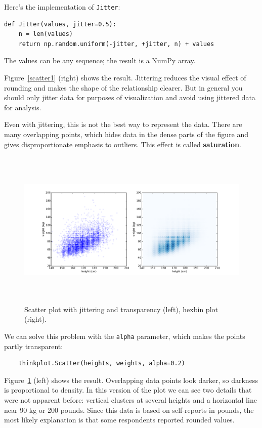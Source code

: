 \documentclass[12pt]{book}
\begin{document}
Here's the implementation of {\tt Jitter}:

\begin{verbatim}
def Jitter(values, jitter=0.5):
    n = len(values)
    return np.random.uniform(-jitter, +jitter, n) + values
\end{verbatim}

The values can be any sequence; the result is a NumPy array.

Figure~\ref{scatter1} (right) shows the result.  Jittering reduces the
visual effect of rounding and makes the shape of the relationship
clearer.  But in general you should only jitter data for purposes of
visualization and avoid using jittered data for analysis.

Even with jittering, this is not the best way to represent the data.
There are many overlapping points, which hides data
in the dense parts of the figure and gives disproportionate emphasis
to outliers.  This effect is called {\bf saturation}.

\begin{figure}
\centerline{\includegraphics[height=3.0in]{figs/scatter2.pdf}}
\caption{Scatter plot with jittering and transparency (left),
hexbin plot (right).}
\label{scatter2}
\end{figure}

We can solve this problem with the {\tt alpha} parameter, which makes
the points partly transparent:
%
\begin{verbatim}
    thinkplot.Scatter(heights, weights, alpha=0.2)
\end{verbatim}
%
Figure~\ref{scatter2} (left) shows the result.  Overlapping data
points look darker, so darkness is proportional to density.  In this
version of the plot we can see two details that were not apparent before:
vertical clusters at several heights and a horizontal line near 90 kg
or 200 pounds.  Since this data is based on self-reports in pounds,
the most likely explanation is that some respondents reported
rounded values.
\end{document}
